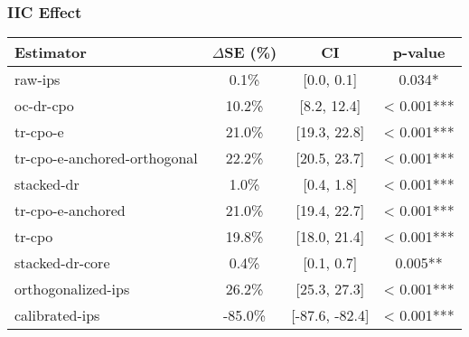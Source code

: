 \subsubsection{IIC Effect}
\begin{tabular}{l|ccc}
\toprule
Estimator & $\Delta$SE (\%) & CI & p-value \\
\midrule
raw-ips & 0.1\% & [0.0, 0.1] & 0.034* \\
oc-dr-cpo & 10.2\% & [8.2, 12.4] & < 0.001*** \\
tr-cpo-e & 21.0\% & [19.3, 22.8] & < 0.001*** \\
tr-cpo-e-anchored-orthogonal & 22.2\% & [20.5, 23.7] & < 0.001*** \\
stacked-dr & 1.0\% & [0.4, 1.8] & < 0.001*** \\
tr-cpo-e-anchored & 21.0\% & [19.4, 22.7] & < 0.001*** \\
tr-cpo & 19.8\% & [18.0, 21.4] & < 0.001*** \\
stacked-dr-core & 0.4\% & [0.1, 0.7] & 0.005** \\
orthogonalized-ips & 26.2\% & [25.3, 27.3] & < 0.001*** \\
calibrated-ips & -85.0\% & [-87.6, -82.4] & < 0.001*** \\
\bottomrule
\end{tabular}